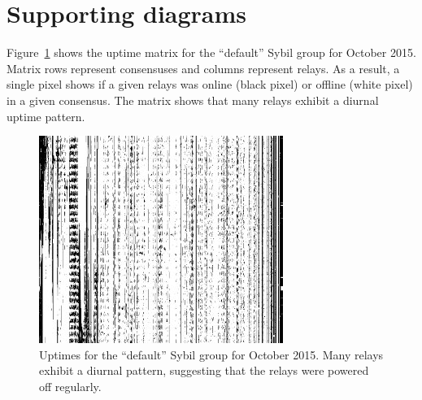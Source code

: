 \section{Supporting diagrams}
Figure~\ref{fig:default-sybils-uptime} shows the uptime matrix for the
``default'' Sybil group for October 2015.  Matrix rows represent consensuses and
columns represent relays.  As a result, a single pixel shows if a given relays
was online (black pixel) or offline (white pixel) in a given consensus.  The
matrix shows that many relays exhibit a diurnal uptime pattern.

\begin{figure}[h]
	\centering
	\includegraphics[width=0.8\linewidth]{diagrams/default-sybils-2015-10.jpg}
	\caption{Uptimes for the ``default'' Sybil group for October 2015.  Many
	relays exhibit a diurnal pattern, suggesting that the relays were powered
	off regularly.}
	\label{fig:default-sybils-uptime}
\end{figure}

